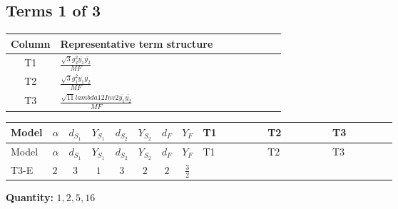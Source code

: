 \documentclass[8pt]{article}
\begin{document}
\begin{landscape}
\subsection*{Terms 1 of 3}
\begin{center}
\begin{tabular}{@{}c >{\raggedright\arraybackslash}p{0.82\linewidth}@{}}
\toprule
Column & Representative term structure \\
\midrule
T1 & \(\displaystyle \frac{\sqrt{3} g_{2}^{2} \overline{y_{1}} \overline{y_{2}}}{MF}\) \\
\midrule
T2 & \(\displaystyle \frac{\sqrt{3} g_{1}^{2} \overline{y_{1}} \overline{y_{2}}}{MF}\) \\
\midrule
T3 & \(\displaystyle \frac{\sqrt{11} lambda12Inv2 \overline{y_{1}} \overline{y_{2}}}{MF}\) \\
\midrule
\bottomrule
\end{tabular}
\end{center}
\smallskip
\tiny
\begin{longtable}{@{}llcccccc >{\raggedright\arraybackslash}p{0.21\linewidth} >{\raggedright\arraybackslash}p{0.21\linewidth} >{\raggedright\arraybackslash}p{0.21\linewidth}@{}}
\toprule
Model & $\alpha$ & $d_{S_1}$ & $Y_{S_1}$ & $d_{S_2}$ & $Y_{S_2}$ & $d_F$ & $Y_F$ & T1 & T2 & T3 \\
\midrule
\endfirsthead
\toprule
Model & $\alpha$ & $d_{S_1}$ & $Y_{S_1}$ & $d_{S_2}$ & $Y_{S_2}$ & $d_F$ & $Y_F$ & T1 & T2 & T3 \\
\midrule
\endhead
T3-E & $2$ & $3$ & $1$ & $3$ & $2$ & $2$ & $\frac{3}{2}$ & \scriptsize\adjustbox{max width=\linewidth}{$\begin{gathered} - \frac{15 \sqrt{3} g_{2}^{2} \overline{y_{1}} \overline{y_{2}}}{8 MF}\end{gathered}$} & \scriptsize\adjustbox{max width=\linewidth}{$\begin{gathered} - \frac{9 \sqrt{3} g_{1}^{2} \overline{y_{1}} \overline{y_{2}}}{8 MF}\end{gathered}$} & \scriptsize\adjustbox{max width=\linewidth}{$\begin{gathered} - \frac{3 \sqrt{11} lambda12Inv2 \overline{y_{1}} \overline{y_{2}}}{22 MF}\end{gathered}$} \\
\midrule
\bottomrule
\end{longtable}
\clearpage
\noindent\textbf{Quantity: }$\mathrm{1,2,5,16}$\par\smallskip

\end{landscape}
\end{document}
